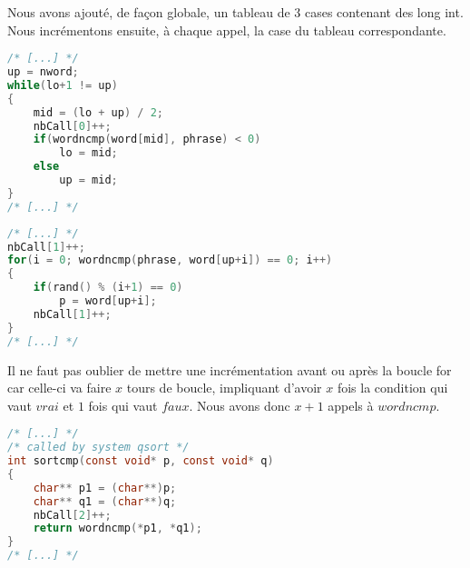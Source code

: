 Nous avons ajouté, de façon globale, un tableau de 3 cases contenant des long int.
Nous incrémentons ensuite, à chaque appel, la case du tableau correspondante.


\begin{lstlisting}[language=C]
/* [...] */
up = nword;
while(lo+1 != up)
{
	mid = (lo + up) / 2;
	nbCall[0]++;
	if(wordncmp(word[mid], phrase) < 0)
		lo = mid;
	else
		up = mid;
}
/* [...] */
\end{lstlisting}

\begin{lstlisting}[language=C]
/* [...] */
nbCall[1]++;
for(i = 0; wordncmp(phrase, word[up+i]) == 0; i++)
{
	if(rand() % (i+1) == 0)
		p = word[up+i];
	nbCall[1]++;
}
/* [...] */
\end{lstlisting}
Il ne faut pas oublier de mettre une incrémentation avant ou après la boucle for car celle-ci va faire $x$ tours de boucle, impliquant d'avoir $x$ fois la condition qui vaut $vrai$ et $1$ fois qui vaut $faux$. Nous avons donc $x + 1$ appels à $wordncmp$.


\begin{lstlisting}[language=C]
/* [...] */
/* called by system qsort */
int sortcmp(const void* p, const void* q)
{
	char** p1 = (char**)p;
	char** q1 = (char**)q;
	nbCall[2]++;
	return wordncmp(*p1, *q1);
}
/* [...] */
\end{lstlisting}

